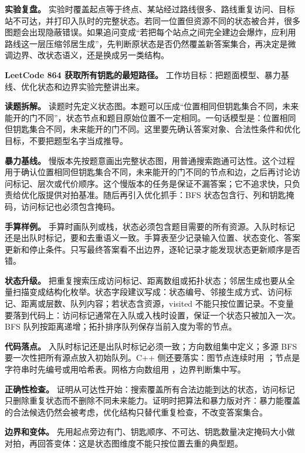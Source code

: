 \textbf{实验复盘。} 实验时覆盖起点等于终点、某站经过路线很多、路线重复访问、目标站不可达，并打印入队时的完整状态。若同一位置但资源不同的状态被合并，很多图题会出现隐蔽错误。如果追问变成“若把每个站点之间完全建边会爆炸，应利用路线这一层压缩邻居生成”，先判断原状态是否仍然覆盖新答案集合，再决定是微调边界、改状态语义，还是换成另一类结构。

\noindent\textbf{LeetCode 864 获取所有钥匙的最短路径。} 工作坊目标：把题面模型、暴力基线、优化状态和边界实验完整讲出来。

\textbf{读题拆解。} 读题时先定义状态图。本题可以压成“位置相同但钥匙集合不同，未来能开的门不同”，状态节点和题目原始位置不一定相同。一句话模型是：位置相同但钥匙集合不同，未来能开的门不同。这里要先确认答案对象、合法性条件和优化目标，不要把题型名字当成推导。

\textbf{暴力基线。} 慢版本先按题意画出完整状态图，用普通搜索跑通可达性。这个过程用于确认位置相同但钥匙集合不同，未来能开的门不同的节点和边，之后再讨论访问标记、层次或代价顺序。这个慢版本的任务是保证不漏答案；它不追求快，只负责给优化版提供对拍基准。随后再引入优化抓手：BFS 状态包含行、列和钥匙掩码，访问标记也必须包含掩码。

\textbf{手算样例。} 手算时画队列或栈，状态必须包含题目需要的所有资源。入队时标记还是出队时标记，要和去重语义一致。手算表至少记录输入位置、状态变化、答案更新和停止条件。只写最终答案看不出边界，逐轮记录才能发现状态更新顺序是否错。

\textbf{状态升级。} 把重复搜索压成访问标记、距离数组或拓扑状态；邻居生成也要从全量扫描变成结构化枚举。状态字段建议写成：状态编号、邻接生成方式、访问标记、距离或层数、队列内容；若状态含资源，visited 不能只按位置记录。不变量要落到代码上：访问标记通常在入队或入栈时设置，保证一个状态只被加入一次。BFS 队列按距离递增；拓扑排序队列保存当前入度为零的节点。

\textbf{代码落点。} 入队时标记还是出队时标记必须一致；方向数组集中定义；多源 BFS 要一次性把所有源点放入初始队列。C++ 侧还要落实：图节点连续时用 ；节点是字符串时先编号或用哈希表。网格方向数组用 ，边界判断集中写。

\textbf{正确性检查。} 证明从可达性开始：搜索覆盖所有合法边能到达的状态，访问标记只删除重复状态而不删除不同未来能力。证明时把算法和暴力版对齐：暴力能覆盖的合法候选仍然会被考虑，优化结构只替代重复检查，不改变答案集合。

\textbf{边界和变体。} 先用起点旁边有门、钥匙顺序、不可达、钥匙数量决定掩码大小做对拍，再回答变体：这是状态图维度不能只按位置去重的典型题。

